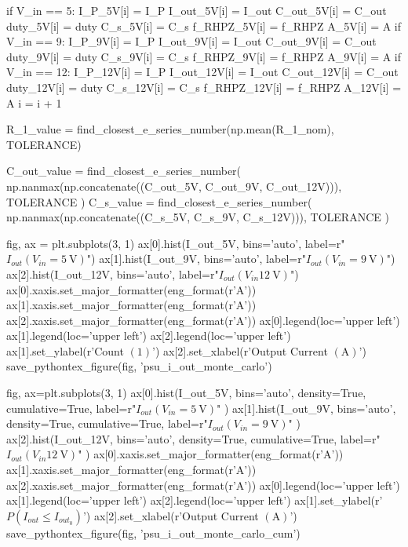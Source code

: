 \documentclass[12pt, titlepage]{/home/air/projects/latex-template/tex-template}
\begin{document}
\begin{pycode}
        if V_in == 5:
            I_P_5V[i] = I_P
            I_out_5V[i] = I_out
            C_out_5V[i] = C_out
            duty_5V[i] = duty
            C_s_5V[i] = C_s
            f_RHPZ_5V[i] = f_RHPZ
            A_5V[i] = A
        if V_in == 9:
            I_P_9V[i] = I_P
            I_out_9V[i] = I_out
            C_out_9V[i] = C_out
            duty_9V[i] = duty
            C_s_9V[i] = C_s
            f_RHPZ_9V[i] = f_RHPZ
            A_9V[i] = A
        if V_in == 12:
            I_P_12V[i] = I_P
            I_out_12V[i] = I_out
            C_out_12V[i] = C_out
            duty_12V[i] = duty
            C_s_12V[i] = C_s
            f_RHPZ_12V[i] = f_RHPZ
            A_12V[i] = A
    i = i + 1

R_1_value = find_closest_e_series_number(np.mean(R_1_nom), TOLERANCE)

C_out_value = find_closest_e_series_number(
    np.nanmax(np.concatenate((C_out_5V, C_out_9V, C_out_12V))),
    TOLERANCE
    )
C_s_value = find_closest_e_series_number(
    np.nanmax(np.concatenate((C_s_5V, C_s_9V, C_s_12V))),
    TOLERANCE
    )

fig, ax = plt.subplots(3, 1)
ax[0].hist(I_out_5V, bins='auto', label=r"$I_{out}(V_{in}=\SI{5}{\volt})$")
ax[1].hist(I_out_9V, bins='auto', label=r"$I_{out}(V_{in}=\SI{9}{\volt})$")
ax[2].hist(I_out_12V, bins='auto', label=r"$I_{out}(V_{in}\SI{12}{\volt})$")
ax[0].xaxis.set_major_formatter(eng_format(r'\unit{\ampere}'))
ax[1].xaxis.set_major_formatter(eng_format(r'\unit{\ampere}'))
ax[2].xaxis.set_major_formatter(eng_format(r'\unit{\ampere}'))
ax[0].legend(loc='upper left')
ax[1].legend(loc='upper left')
ax[2].legend(loc='upper left')
ax[1].set_ylabel(r'Count $\left(1\right)$')
ax[2].set_xlabel(r'Output Current $\left(\unit{\ampere}\right)$')
save_pythontex_figure(fig, 'psu_i_out_monte_carlo')

fig, ax=plt.subplots(3, 1)
ax[0].hist(I_out_5V, bins='auto', density=True, cumulative=True,
           label=r"$I_{out}(V_{in}=\SI{5}{\volt})$"
           )
ax[1].hist(I_out_9V, bins='auto', density=True, cumulative=True,
           label=r"$I_{out}(V_{in}=\SI{9}{\volt})$"
           )
ax[2].hist(I_out_12V, bins='auto', density=True, cumulative=True,
           label=r"$I_{out}(V_{in}\SI{12}{\volt})$"
           )
ax[0].xaxis.set_major_formatter(eng_format(r'\unit{\ampere}'))
ax[1].xaxis.set_major_formatter(eng_format(r'\unit{\ampere}'))
ax[2].xaxis.set_major_formatter(eng_format(r'\unit{\ampere}'))
ax[0].legend(loc='upper left')
ax[1].legend(loc='upper left')
ax[2].legend(loc='upper left')
ax[1].set_ylabel(r'$P\left(I_{out} \leq I_{out_0}\right)$')
ax[2].set_xlabel(r'Output Current $\left(\unit{\ampere}\right)$')
save_pythontex_figure(fig, 'psu_i_out_monte_carlo_cum')


\end{pycode}
\end{document}
